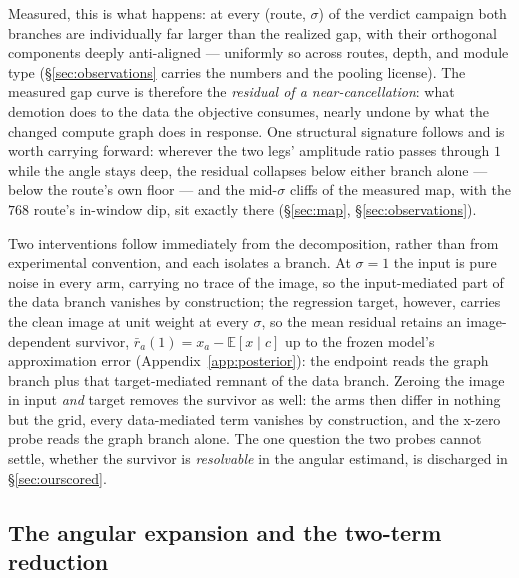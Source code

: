 Measured, this is what happens: at every (route, $\sigma$) of the
verdict campaign both branches are individually far larger than the
realized gap, with their orthogonal components deeply anti-aligned
--- uniformly so across routes, depth, and module type
(\S\ref{sec:observations} carries the numbers and the pooling
license). The measured gap curve is therefore the \emph{residual of
a near-cancellation}: what demotion does to the data the objective
consumes, nearly undone by what the changed compute graph does in
response. One structural signature follows and is worth carrying
forward: wherever the two legs' amplitude ratio passes through $1$
while the angle stays deep, the residual collapses below either
branch alone --- below the route's own floor --- and the
mid-$\sigma$ cliffs of the measured map, with the $768$ route's
in-window dip, sit exactly there
(\S\ref{sec:map}, \S\ref{sec:observations}).

Two interventions follow immediately from the decomposition, rather
than from experimental convention, and each isolates a branch. At
$\sigma = 1$ the input is pure noise in every arm, carrying no trace
of the image, so the input-mediated part of the data branch vanishes
by construction; the regression target, however, carries the clean
image at unit weight at every $\sigma$, so the mean residual retains
an image-dependent survivor,
$\bar r_a(1) = x_a - \mathbb{E}[x \mid c]$ up to the frozen model's
approximation error (Appendix~\ref{app:posterior}): the endpoint
reads the graph branch plus that target-mediated remnant of the data
branch. Zeroing the image in input \emph{and} target removes the
survivor as well: the arms then differ in nothing but the grid, every
data-mediated term vanishes by construction, and the x-zero probe
reads the graph branch alone. The one question the two probes cannot
settle, whether the survivor is \emph{resolvable} in the angular
estimand, is discharged in \S\ref{sec:ourscored}.

\subsection{The angular expansion and the two-term reduction}
\label{sec:reduction}


